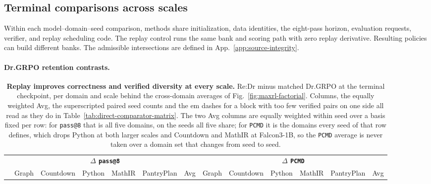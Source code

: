 \documentclass{article}
\newcommand{\1}{\mathbf 1}
\newcommand{\pmd}{\texttt{PCMD}}
\theoremstyle{remark}
\theoremstyle{definition}
\theoremstyle{plain}
\begin{document}
\subsection{Terminal comparisons across scales}
\label{app:scale-matrix}
\label{app:scale-snapshot}
\label{app:maxrl-scale-extensions}
\label{app:current-campaign-results}

Within each model--domain--seed comparison, methods share initialization,
data identities, the eight-pass horizon, evaluation requests, verifier, and
replay scheduling code. The replay control runs the same bank and scoring
path with zero replay derivative. Resulting policies can build different
banks. The admissible intersections are defined in
App.~\ref{app:source-integrity}.

\crossscaletablematerial

\paragraph{Dr.GRPO retention contrasts.}
\label{app:retention-numerical-detail}

\begin{table}[!tbp]
  \centering
  \caption{\textbf{Replay improves correctness and verified diversity at every
  scale.} Re:Dr minus matched Dr.GRPO at the terminal checkpoint, per domain
  and scale behind the cross-domain averages of
  Fig.~\ref{fig:maxrl-factorial}. Columns, the equally weighted Avg, the
  superscripted paired seed counts and the em dashes for a block with too few
  verified pairs on one side all read as they do in
  Table~\ref{tab:direct-comparator-matrix}. The two Avg columns are equally
  weighted within seed over a basis fixed per row: for \texttt{pass@8} that is
  all five domains, on the seeds all five share; for \pmd{} it is the domains
  every seed of that row defines, which drops Python at both larger scales and
  Countdown and MathIR at Falcon3-1B, so the \pmd{} average is never taken
  over a domain set that changes from seed to seed.}
  \label{tab:cross-scale-terminal-effects}
  \scriptsize
  \setlength{\tabcolsep}{1.4pt}
  \renewcommand{\arraystretch}{0.92}
  \begin{tabular}{@{}l*{12}{r}@{}}
    \toprule
    & \multicolumn{6}{c}{\textbf{$\Delta$ \texttt{pass@8}}}
      & \multicolumn{6}{c}{\textbf{$\Delta$ \pmd{}}} \\
    \cmidrule(lr){2-7}\cmidrule(l){8-13}
    & Graph & Countdown & Python & MathIR & PantryPlan & Avg
      & Graph & Countdown & Python & MathIR & PantryPlan & Avg \\
    \midrule
    
  \end{tabular}
\end{table}
\end{document}
